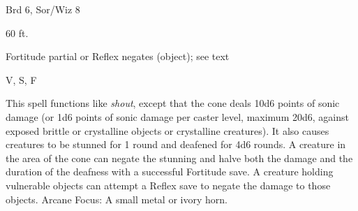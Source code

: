 
\begin{description*}
\item[Level:] Brd 6, Sor/Wiz 8
\item[Range:] 60 ft.
\item[Saving Throw:] Fortitude partial or Reflex negates (object); see text
\item[Components:] V, S, F
\end{description*}

This spell functions like \textit{shout}, except that the cone deals 10d6 points
of sonic damage (or 1d6 points of sonic damage per caster level, maximum 20d6,
against exposed brittle or crystalline objects or crystalline creatures). It also
causes creatures to be stunned for 1 round and deafened for 4d6 rounds. A creature
in the area of the cone can negate the stunning and halve both the damage and the
duration of the deafness with a successful Fortitude save. A creature holding vulnerable
objects can attempt a Reflex save to negate the damage to those objects.
Arcane Focus: A small metal or ivory horn.